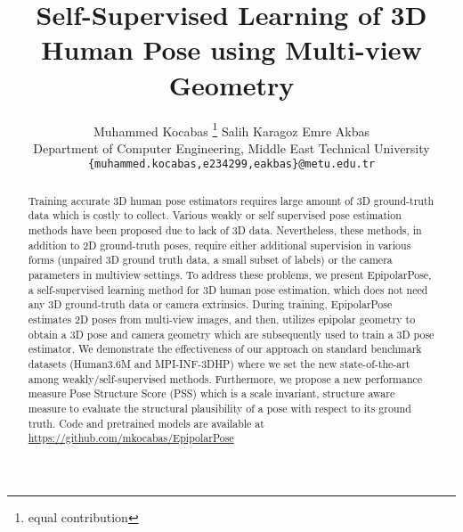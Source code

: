 \documentclass[10pt,twocolumn,letterpaper]{article}
\newcommand*\samethanks[1][\value{footnote}]{\footnotemark[#1]}
\begin{document}
\title{Self-Supervised Learning of 3D Human Pose using Multi-view Geometry}
\author{Muhammed Kocabas \thanks{equal contribution}
\qquad
Salih Karagoz \samethanks[1]
\qquad
Emre Akbas
\\
Department of Computer Engineering, Middle East Technical University \\
{\tt\small \{muhammed.kocabas,e234299,eakbas\}@metu.edu.tr}
}

\maketitle
\begin{abstract}
Training accurate 3D human pose estimators requires large amount of 3D ground-truth data  which is costly to collect. Various weakly or self supervised pose estimation methods have been proposed due to lack of 3D data. Nevertheless, these methods, in addition to 2D ground-truth poses, require either additional supervision in various forms (\eg unpaired 3D ground truth data, a small subset of labels) or the camera parameters in multiview settings. To address these problems, we present EpipolarPose, a self-supervised learning method for 3D human pose estimation, which does not need  any 3D ground-truth data or camera extrinsics. During training, EpipolarPose estimates 2D poses from multi-view images, and then, utilizes epipolar geometry to obtain a 3D pose and camera geometry which are subsequently used to train a 3D pose estimator. We demonstrate the effectiveness of our approach on standard benchmark datasets (\ie Human3.6M and MPI-INF-3DHP) where we set the new state-of-the-art among weakly/self-supervised methods. Furthermore, we propose a new performance measure Pose Structure Score (PSS) which is a scale invariant, structure aware measure to evaluate the structural plausibility of a pose with respect to its ground truth. Code and pretrained models are available at \url{https://github.com/mkocabas/EpipolarPose}

\end{abstract}
\end{document}
